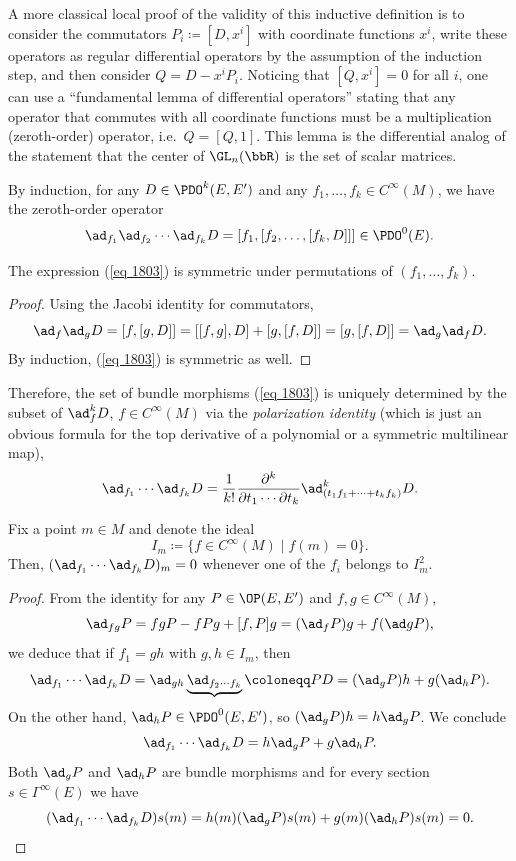 \begin{rem}
    A more classical local proof of the validity of this inductive definition is to consider the commutators $P_i\coloneqq [D,x^i]$ with coordinate functions $x^i$, write these operators as regular differential operators by the assumption of the induction step, and then consider $Q=D-x^iP_i$. Noticing that $[Q,x^i]=0$ for all $i$, one can use a ``fundamental lemma of differential operators'' stating that any operator that commutes with all coordinate functions must be a multiplication (zeroth-order) operator, i.e.\  $Q=[Q,1]$. This lemma is the differential analog of the statement that the center of $\GL_n(\bbR)$ is the set of scalar matrices.
\end{rem}

By induction, for any $D\in\PDO^k(E,E')$ and any $f_1,\ldots,f_k\in C^\infty(M)$, we have the zeroth-order operator
\[\ad_{f_1}\ad_{f_2}\cdots \ad_{f_k} D=[f_1,[f_2,\ldots,[f_k,D]]]\in \PDO^0(E).\label{eq 1803}\]

\begin{lem}
    The expression (\ref{eq 1803}) is symmetric under permutations of $(f_1,\ldots,f_k)$.
\end{lem}
\begin{proof}
    Using the Jacobi identity for commutators,
    \[\ad_f\ad_g D=[f,[g,D]]=[[f,g],D]+[g,[f,D]]=[g,[f,D]]=\ad_g\ad_f D.\]
    By induction, (\ref{eq 1803}) is symmetric as well.
\end{proof}

Therefore, the set of bundle morphisms (\ref{eq 1803}) is uniquely determined by the subset of $\ad_f^k D$, $f\in C^\infty(M)$ via the \emph{polarization identity} (which is just an obvious formula for the top derivative of a polynomial or a symmetric multilinear map),
\[\ad_{f_1}\cdots \ad_{f_k}D=\frac{1}{k!}\frac{\partial^k}{\partial t_1\cdots \partial t_k}\ad_{(t_1f_1+\cdots+t_kf_k)}^k D.\]

\begin{lem}
    Fix a point $m\in M$ and denote the ideal 
    \[I_m\coloneqq \{f\in C^\infty(M)\mid f(m)=0\}.\]
    Then, $(\ad_{f_1}\cdots \ad_{f_k}D)_m=0$ whenever one of the $f_i$ belongs to $I^2_m$.
\end{lem}
\begin{proof}
    From the identity for any $P\in \OP(E,E')$ and $f,g\in C^\infty(M)$,
    \[\ad_{fg}P=fgP-fPg+[f,P]g=(\ad_f P)g+f(\ad gP),\]
    we deduce that if $f_1=gh$ with $g,h\in I_m$, then 
    \[\ad_{f_1}\cdots \ad_{f_k}D=\ad_{gh}\underbrace{\ad_{f_2\cdots f_k}}{\coloneqq P}D=(\ad_g P)h+g(\ad_h P).\]
    On the other hand, $\ad_h P\in\PDO^0(E,E')$, so $(\ad_g P)h=h\ad_g P$. We conclude 
    \[\ad_{f_1}\cdots \ad_{f_k}D=h\ad_g P+g\ad_h P.\]
    Both $\ad_g P$ and $\ad_h P$ are bundle morphisms and for every section $s\in\Gamma^\infty(E)$ we have 
    \[(\ad_{f_1}\cdots \ad_{f_k}D)s(m)=h(m)(\ad_g P)s(m)+g(m)(\ad_h P)s(m)=0.\]
\end{proof}

